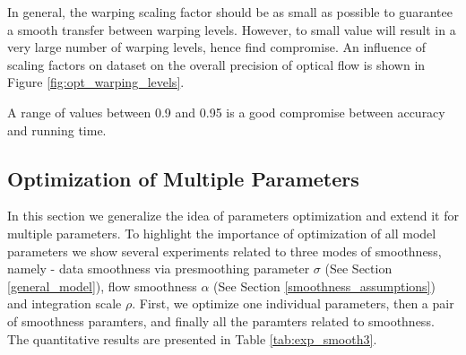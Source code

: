 In general, the warping scaling factor should be as small as possible to guarantee a smooth transfer between warping levels. However, to small value will result in a very large number of warping levels, hence find compromise. An influence of scaling factors on \rub dataset on the overall precision of optical flow is shown in Figure \ref{fig:opt_warping_levels}.

A range of values between 0.9 and 0.95 is a good compromise between accuracy and running time.


%
%
%



\subsection{Optimization of Multiple Parameters}

In this section we generalize the idea of parameters optimization and extend it for multiple parameters.
To highlight the importance of optimization of all model parameters we show several experiments related to three modes of smoothness, namely - data smoothness via presmoothing parameter $\sigma$ (See Section \ref{general_model}), flow smoothness $\alpha$ (See Section \ref{smoothness_assumptions}) and integration scale $\rho$.
First, we optimize one individual parameters, then a pair of smoothness paramters, and finally all the paramters related to smoothness. The quantitative results are presented in Table \ref{tab:exp_smooth3}.  

